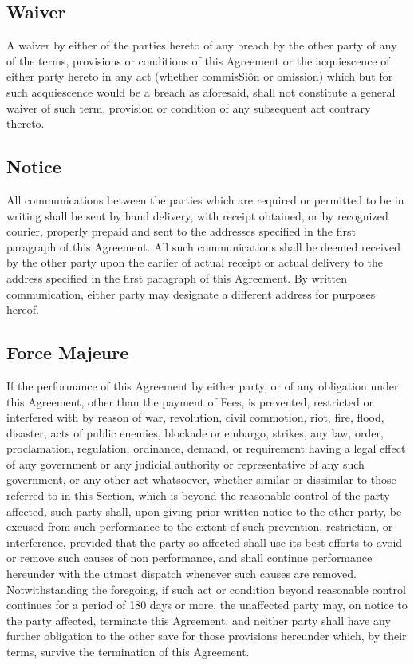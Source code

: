 \documentclass[letterpaper,10pt,english]{sphinxmanual}
\begin{document}
\subsection{Waiver}
\label{\detokenize{miscellaneous:waiver}}
A waiver by either of the parties hereto of any breach by the other party of any of the terms, provisions or conditions of this Agreement or the acquiescence of either party hereto in any act (whether commisSiôn or omission) which but for such acquiescence would be a breach as aforesaid, shall not constitute a general waiver of such term, provision or condition of any subsequent act contrary thereto.


\subsection{Notice}
\label{\detokenize{miscellaneous:notice}}
All communications between the parties which are required or permitted to be in writing shall be sent by hand delivery, with receipt obtained, or by recognized courier, properly prepaid and sent to the addresses specified in the first paragraph of this Agreement. All such communications shall be deemed received by the other party upon the earlier of actual receipt or actual delivery to the address specified in the first paragraph of this Agreement. By written communication, either party may designate a different address for purposes hereof.


\subsection{Force Majeure}
\label{\detokenize{miscellaneous:force-majeure}}
If the performance of this Agreement by either party, or of any obligation under this Agreement, other than the payment of Fees, is prevented, restricted or interfered with by reason of war, revolution, civil commotion, riot, fire, flood, disaster, acts of public enemies, blockade or embargo, strikes, any law, order, proclamation, regulation, ordinance, demand, or requirement having a legal effect of any government or any judicial authority or representative of any such government, or any other act whatsoever, whether similar or dissimilar to those referred to in this Section, which is beyond the reasonable control of the party affected, such party shall, upon giving prior written notice to the other party, be excused from such performance to the extent of such prevention, restriction, or interference, provided that the party so affected shall use its best efforts to avoid or remove such causes of non performance, and shall continue performance hereunder with the utmost dispatch whenever such causes are removed. Notwithstanding the foregoing, if such act or condition beyond reasonable control continues for a period of 180 days or more, the unaffected party may, on notice to the party affected, terminate this Agreement, and neither party shall have any further obligation to the other save for those provisions hereunder which, by their terms, survive the termination of this Agreement.
\end{document}
